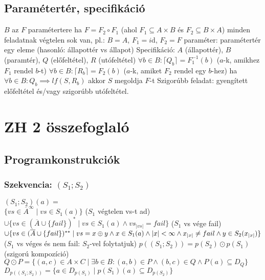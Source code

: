 \documentclass[12pt,a4paper]{article}
\begin{document}
\subsection{Paramétertér, specifikáció}

\begin{outline}
	\1 $B$ az $F$ paramétertere ha $F=F_2 \circ F_1$ (ahol $F_1 \subseteq A \times B$ és $F_2 \subseteq B \times A$)
		\2 minden feladatnak végtelen sok van, pl.: $B=A$, $F_1 = i$d, $F_2 = F$
		\2 paraméter: paramétertér egy eleme (hasonló: állapottér vs állapot)
	\1 Specifikáció: $A$ (állapottér), $B$ (paramtér), $Q$ (előfeltétel), $R$ (utófeltétel)
		\2 $\forall b \in B: \lceil Q_b \rceil = F_1^{-1}(b)$ ($a$-k, amikhez $F_1$ rendel $b$-t)
		\2 $\forall b \in B: \lceil R_b \rceil = F_2(b)$ ($a$-k, amiket $F_2$ rendel egy $b$-hez)
		\2 ha $\forall b \in B: Q_b \implies lf(S,R_b)$ akkor $S$ megoldja $F$-t
	\1 Szigorúbb feladat: gyengített előfeltétel és/vagy szigorúbb utófeltétel.
\end{outline}

\pagebreak

\section{ZH 2 összefoglaló}

\subsection{Programkonstrukciók}

\subsubsection{Szekvencia: $(S_1;S_2)$}

\begin{outline}
	\1 $(S_1;S_2)(a) =$\\
	$\{vs \in \overline{A}^\infty \;|\; vs \in S_1(a)\}$ \;\;\;($S_1$ végtelen vs-t ad)\\
	$\cup \{vs \in (\overline{A} \cup \{fail\})^* \;|\; vs \in S_1(a) \wedge vs_{|vs|}=fail\}$ \;\;\;($S_1$ vs vége fail)\\
	$\cup \{vs \in (\overline{A} \cup \{fail\})^{**} \;|\; vs=x \oplus y \wedge x \in S_1(a) \wedge |x| < \infty \wedge \\ x_{|x|} \ne fail \wedge y \in S_2(x_{|x|}) \}$
	\;\;\;($S_1$ vs véges és nem fail: $S_2$-vel folytatjuk)
	\1 $p((S_1;S_2))=p(S_2) \odot p(S_1)$ \;\; (szigorú kompozíció)\\
	$Q \odot P=\{(a,c) \in A \times C \;|\; \exists b \in B: (a,b) \in P \wedge (b,c) \in Q \wedge P(a) \subseteq D_Q\}$
	\1 $D_{p((S_1;S_2))}=\{a \in D_{p(S_1)} \;|\; p(S_1)(a) \subseteq D_{p(S_2)} \}$
\end{outline}
\end{document}
